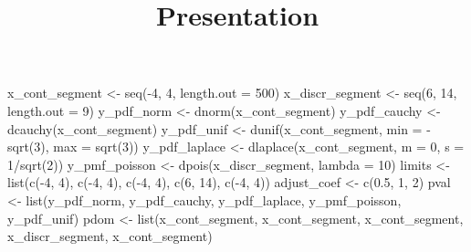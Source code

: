 \documentclass[
]{article}
\title{Presentation}
\author{}
\date{\vspace{-2.5em}}
\newenvironment{Shaded}{\begin{snugshade}}{\end{snugshade}}
\newcommand{\AttributeTok}[1]{\textcolor[rgb]{0.77,0.63,0.00}{#1}}
\newcommand{\DecValTok}[1]{\textcolor[rgb]{0.00,0.00,0.81}{#1}}
\newcommand{\FloatTok}[1]{\textcolor[rgb]{0.00,0.00,0.81}{#1}}
\newcommand{\FunctionTok}[1]{\textcolor[rgb]{0.00,0.00,0.00}{#1}}
\newcommand{\NormalTok}[1]{#1}
\newcommand{\OtherTok}[1]{\textcolor[rgb]{0.56,0.35,0.01}{#1}}
\newcommand{\SpecialCharTok}[1]{\textcolor[rgb]{0.00,0.00,0.00}{#1}}
\begin{document}
\maketitle

\begin{Shaded}
\begin{Highlighting}[]
\NormalTok{x\_cont\_segment }\OtherTok{\textless{}{-}} \FunctionTok{seq}\NormalTok{(}\SpecialCharTok{{-}}\DecValTok{4}\NormalTok{, }\DecValTok{4}\NormalTok{, }\AttributeTok{length.out =} \DecValTok{500}\NormalTok{)}
\NormalTok{x\_discr\_segment }\OtherTok{\textless{}{-}} \FunctionTok{seq}\NormalTok{(}\DecValTok{6}\NormalTok{, }\DecValTok{14}\NormalTok{, }\AttributeTok{length.out =} \DecValTok{9}\NormalTok{)}
\NormalTok{y\_pdf\_norm }\OtherTok{\textless{}{-}} \FunctionTok{dnorm}\NormalTok{(x\_cont\_segment)}
\NormalTok{y\_pdf\_cauchy }\OtherTok{\textless{}{-}} \FunctionTok{dcauchy}\NormalTok{(x\_cont\_segment)}
\NormalTok{y\_pdf\_unif }\OtherTok{\textless{}{-}} \FunctionTok{dunif}\NormalTok{(x\_cont\_segment, }\AttributeTok{min =} \SpecialCharTok{{-}}\FunctionTok{sqrt}\NormalTok{(}\DecValTok{3}\NormalTok{), }\AttributeTok{max =} \FunctionTok{sqrt}\NormalTok{(}\DecValTok{3}\NormalTok{))}
\NormalTok{y\_pdf\_laplace }\OtherTok{\textless{}{-}} \FunctionTok{dlaplace}\NormalTok{(x\_cont\_segment, }\AttributeTok{m =} \DecValTok{0}\NormalTok{, }\AttributeTok{s =} \DecValTok{1}\SpecialCharTok{/}\FunctionTok{sqrt}\NormalTok{(}\DecValTok{2}\NormalTok{))}
\NormalTok{y\_pmf\_poisson }\OtherTok{\textless{}{-}} \FunctionTok{dpois}\NormalTok{(x\_discr\_segment, }\AttributeTok{lambda =} \DecValTok{10}\NormalTok{)}
\NormalTok{limits }\OtherTok{\textless{}{-}} \FunctionTok{list}\NormalTok{(}\FunctionTok{c}\NormalTok{(}\SpecialCharTok{{-}}\DecValTok{4}\NormalTok{, }\DecValTok{4}\NormalTok{), }\FunctionTok{c}\NormalTok{(}\SpecialCharTok{{-}}\DecValTok{4}\NormalTok{, }\DecValTok{4}\NormalTok{), }\FunctionTok{c}\NormalTok{(}\SpecialCharTok{{-}}\DecValTok{4}\NormalTok{, }\DecValTok{4}\NormalTok{), }\FunctionTok{c}\NormalTok{(}\DecValTok{6}\NormalTok{, }\DecValTok{14}\NormalTok{), }\FunctionTok{c}\NormalTok{(}\SpecialCharTok{{-}}\DecValTok{4}\NormalTok{, }\DecValTok{4}\NormalTok{))}
\NormalTok{adjust\_coef }\OtherTok{\textless{}{-}} \FunctionTok{c}\NormalTok{(}\FloatTok{0.5}\NormalTok{, }\DecValTok{1}\NormalTok{, }\DecValTok{2}\NormalTok{)}
\NormalTok{pval }\OtherTok{\textless{}{-}} \FunctionTok{list}\NormalTok{(y\_pdf\_norm, y\_pdf\_cauchy, y\_pdf\_laplace, y\_pmf\_poisson, y\_pdf\_unif)}
\NormalTok{pdom }\OtherTok{\textless{}{-}} \FunctionTok{list}\NormalTok{(x\_cont\_segment, x\_cont\_segment, x\_cont\_segment, x\_discr\_segment, x\_cont\_segment)}

\end{Highlighting}
\end{Shaded}
\end{document}
